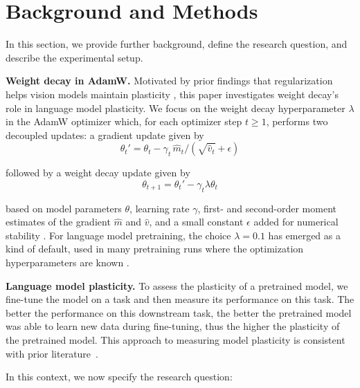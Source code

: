 \section{Background and Methods}
\label{sec:methods}




In this section, we provide further background, define the research question, and describe the experimental setup.


\textbf{Weight decay in AdamW.} Motivated by prior findings that regularization helps vision models maintain plasticity \citep{dohare2024loss}, this paper investigates weight decay's role in language model plasticity. We focus on the weight decay hyperparameter $\lambda$ in the AdamW optimizer which, for each optimizer step $t \geq 1$, performs two decoupled updates: a gradient update given by
\begin{equation}
\theta_t' = \theta_t - \gamma_t \,\hat{m}_t \big/ (\sqrt{\hat{v}_t} + \epsilon)
\end{equation}

followed by a weight decay update given by
\begin{equation}
\theta_{t+1} = \theta_t' - \gamma_t \lambda \theta_{t}
\end{equation}

based on model parameters $\theta$, learning rate $\gamma$, first- and second-order moment estimates of the gradient $\hat{m}$ and $\hat{v}$, and a small constant $\epsilon$ added for numerical stability \citep{loshchilov2019decoupled}. For language model pretraining, the choice $\lambda=0.1$ has emerged as a kind of default, used in many pretraining runs where the optimization hyperparameters are known \citep{brown2020language, touvron2023llama2, olmo2024olmo2}. %




\textbf{Language model plasticity.} 
To assess the plasticity of a pretrained model, we fine-tune the model on a task and then measure its performance on this task. The better the performance on this downstream task, the better the pretrained model was able to learn new data during fine-tuning, thus the higher the plasticity of the pretrained model. This approach to measuring model plasticity is consistent with prior literature~\citep{berariu2021study,dohare2024loss}.


In this context, we now specify the research question:


